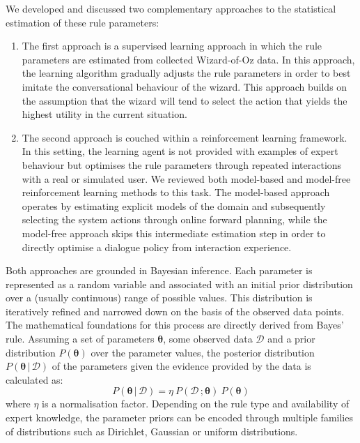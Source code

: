 We developed and discussed two complementary approaches to the statistical estimation of these rule parameters:
\begin{enumerate}
\item The first approach is a supervised learning approach in which the rule parameters are estimated from collected Wizard-of-Oz data.  In this approach, the learning algorithm gradually adjusts the rule parameters in order to best imitate the conversational behaviour of the wizard. This approach builds on the assumption that the wizard will tend to select the action that yields the highest utility in the current situation. 
\item The second approach is couched within a reinforcement learning framework.  In this setting, the learning agent is not provided with examples of expert behaviour but optimises the rule parameters through repeated interactions with a real or simulated user. We reviewed both model-based and model-free reinforcement learning methods to this task.  The model-based approach operates by estimating explicit models of the domain and subsequently selecting the system actions through online forward planning, while the model-free approach skips this intermediate estimation step in order to directly optimise a dialogue policy from interaction experience. 
\end{enumerate}

Both approaches are grounded in Bayesian inference.  Each parameter is represented as a random variable and associated with an initial prior distribution over a (usually continuous) range of possible values. This distribution is iteratively refined and narrowed down on the basis of the observed data points. The mathematical foundations for this process are directly derived from Bayes' rule. Assuming a set of parameters $\boldsymbol\theta$, some observed data $\mathcal{D}$ and a prior distribution $P(\boldsymbol\theta)$ over the parameter values, the posterior distribution $P(\boldsymbol\theta \, | \, \mathcal{D})$ of the parameters given the evidence provided by the data is calculated as:
\begin{equation}
P(\boldsymbol\theta \, | \, \mathcal{D}) = \eta \ P(\mathcal{D} \,; \boldsymbol\theta) \ P(\boldsymbol\theta)
\end{equation}
where $\eta$ is a normalisation factor. Depending on the rule type and availability of expert knowledge, the parameter priors can be encoded through multiple families of distributions such as Dirichlet, Gaussian or uniform distributions. 

